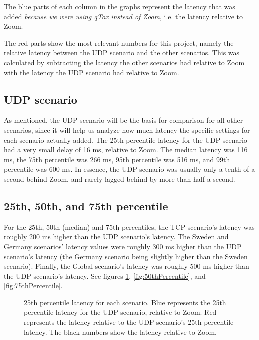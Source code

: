 \documentclass{kththesis}
\begin{document}
The blue parts of each column in the graphs represent the latency that was added \emph{because we were using qTox instead of Zoom}, i.e. the latency relative to Zoom.

The red parts show the most relevant numbers for this project, namely the relative latency between the UDP scenario and the other scenarios. This was calculated by subtracting the latency the other scenarios had relative to Zoom with the latency the UDP scenario had relative to Zoom.

\subsection{UDP scenario}
As mentioned, the UDP scenario will be the basis for comparison for all other scenarios, since it will help us analyze how much latency the specific settings for each scenario actually added. The 25th percentile latency for the UDP scenario had a very small delay of 16 ms, relative to Zoom. The median latency was 116 ms, the 75th percentile was 266 ms, 95th percentile was 516 ms, and 99th percentile was 600 ms. In essence, the UDP scenario was usually only a tenth of a second behind Zoom, and rarely lagged behind by more than half a second.

\subsection{25th, 50th, and 75th percentile}
For the 25th, 50th (median) and 75th percentiles, the TCP scenario's latency was roughly 200 ms higher than the UDP scenario's latency. The Sweden and Germany scenarios' latency values were roughly 300 ms higher than the UDP scenario's latency (the Germany scenario being slightly higher than the Sweden scenario). Finally, the Global scenario's latency was roughly 500 ms higher than the UDP scenario's latency. See figures \ref{fig:25thPercentile}, \ref{fig:50thPercentile}, and \ref{fig:75thPercentile}.

\begin{figure}[!htb]
    \centering
    
    \caption{25th percentile latency for each scenario. Blue represents the 25th percentile latency for the UDP scenario, relative to Zoom. Red represents the latency relative to the UDP scenario's 25th percentile latency. The black numbers show the latency relative to Zoom.}
    \label{fig:25thPercentile}
\end{figure}
\end{document}
